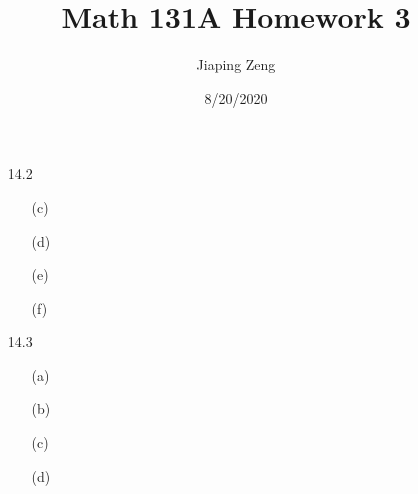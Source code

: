 \documentclass{article}
\title{Math 131A Homework 3}
\date{8/20/2020}
\author{Jiaping Zeng}
\begin{document}
\maketitle

\begin{itemize}
    \item [14.2]
          \begin{itemize}
              \item [(c)]
              \item [(d)]
              \item [(e)]
              \item [(f)]
          \end{itemize}
    \item [14.3]
          \begin{itemize}
              \item [(a)]
              \item [(b)]
              \item [(c)]
              \item [(d)]
          \end{itemize}
\end{itemize}
\end{document}
